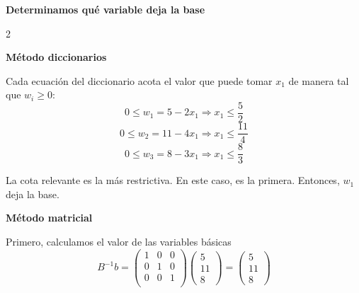 \documentclass{article}
\newcommand{\binv}{B^{-1}}
\begin{document}
    \begin{center}
        \textbf{Determinamos qué variable deja la base}
    \end{center}
    \begin{multicols}{2}
        \raggedcolumns
        \begin{center}
            \textbf{Método diccionarios}
        \end{center}

        Cada ecuación del diccionario acota el valor que puede tomar $x_1$ de manera tal que $w_i\geq0$:
        \[ 0\leq w_1 = 5-2x_1 \Rightarrow x_1 \leq \frac{5}{2} \]
        \[ 0\leq w_2 = 11-4x_1 \Rightarrow x_1 \leq \frac{11}{4} \]
        \[ 0\leq w_3 = 8-3x_1 \Rightarrow x_1 \leq \frac{8}{3} \]

        La cota relevante es la más restrictiva. En este caso, es la primera. Entonces, $w_1$ deja la base.

        \columnbreak
        \begin{center}
            \textbf{Método matricial}
        \end{center}

        Primero, calculamos el valor de las variables básicas
        \[\binv b =         \begin{pmatrix}
                1 & 0 & 0 \\
                0 & 1 & 0 \\
                0 & 0 & 1 \\
        \end{pmatrix}
        \begin{pmatrix}
            5 \\
            11 \\
            8
        \end{pmatrix} =
        \begin{pmatrix}
            5 \\
            11 \\
            8
        \end{pmatrix}
        \]


\end{multicols}
\end{document}
